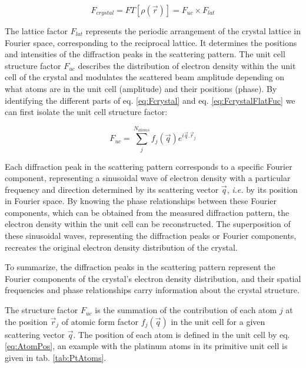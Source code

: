 \begin{equation}
    F_{crystal} = FT[\rho(\vec{r})] = F_{uc} \times F_{lat}
    \label{eq:FcrystalFlatFuc}
\end{equation}

The lattice factor $F_{lat}$ represents the periodic arrangement of the crystal lattice in Fourier space, corresponding to the reciprocal lattice.
It determines the positions and intensities of the diffraction peaks in the scattering pattern.
The unit cell structure factor $F_{uc}$ describes the distribution of electron density within the unit cell of the crystal and modulates the scattered beam amplitude depending on what atoms are in the unit cell (amplitude) and their positions (phase).
By identifying the different parts of eq. \ref{eq:Fcrystal} and eq. \ref{eq:FcrystalFlatFuc} we can first isolate the unit cell structure factor:

\begin{equation}
    \label{eq:StrucFactor}
    F_{uc} = \sum_j^{N_{atoms}} f_j(\vec{q}) e^{i\vec{q}.\vec{r}_j}
\end{equation}

Each diffraction peak in the scattering pattern corresponds to a specific Fourier component, representing a sinusoidal wave of electron density with a particular frequency and direction determined by its scattering vector $\vec{q}$, \textit{i.e.} by its position in Fourier space.
By knowing the phase relationships between these Fourier components, which can be obtained from the measured diffraction pattern, the electron density within the unit cell can be reconstructed.
The superposition of these sinusoidal waves, representing the diffraction peaks or Fourier components, recreates the original electron density distribution of the crystal.

To summarize, the diffraction peaks in the scattering pattern represent the Fourier components of the crystal's electron density distribution, and their spatial frequencies and phase relationships carry information about the crystal structure.

The structure factor $F_{uc}$ is the summation of the contribution of each atom $j$ at the position $\vec{r}_j$ of atomic form factor $f_j(\vec{q})$ in the unit cell for a given scattering vector $\vec{q}$.
The position of each atom is defined in the unit cell by eq. \ref{eq:AtomPos}, an example with the platinum atoms in its primitive unit cell is given in tab. \ref{tab:PtAtoms}.

